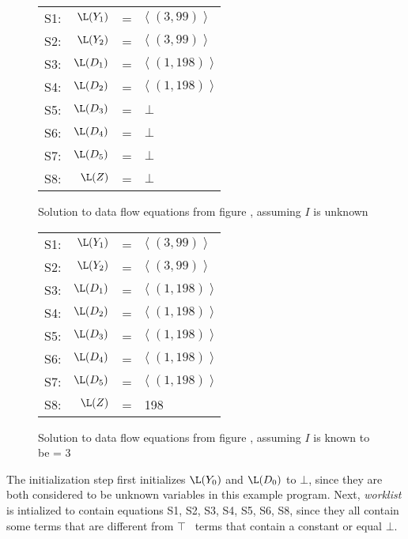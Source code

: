 \begin{figure}
\begin{center}
\begin{tabular}{r r c l}
\mbox{S1:} & $\L(Y_1)$ & = & $\langle \; (3,99)\; \rangle$ \\
\mbox{S2:} & $\L(Y_2)$ & = & $\langle \; (3,99)\; \rangle$ \\
\mbox{S3:} & $\L(D_1)$ & = & $\langle \; (1,198)\; \rangle$ \\
\mbox{S4:} & $\L(D_2)$ & = & $\langle \; (1,198)\; \rangle$ \\
\mbox{S5:} & $\L(D_3)$ & = & $\bot$\\
\mbox{S6:} & $\L(D_4)$ & = & $\bot$\\
\mbox{S7:} & $\L(D_5)$ & = & $\bot$\\
\mbox{S8:} & $\L(Z)$ & =  & $\bot$
\end{tabular}
\end{center}
\caption{Solution to data flow equations from figure \protect{\ref{fig:sc-ex-df}}, assuming $I$ is unknown}
\label{fig:sc-ex-sol1}
\end{figure}

\begin{figure}
\begin{center}
\begin{tabular}{r r c l}
\mbox{S1:} & $\L(Y_1)$ & = & $\langle \; (3,99)\; \rangle$ \\
\mbox{S2:} & $\L(Y_2)$ & = & $\langle \; (3,99)\; \rangle$ \\
\mbox{S3:} & $\L(D_1)$ & = & $\langle \; (1,198)\; \rangle$ \\
\mbox{S4:} & $\L(D_2)$ & = & $\langle \; (1,198)\; \rangle$ \\
\mbox{S5:} & $\L(D_3)$ & = & $\langle \; (1,198)\; \rangle$ \\
\mbox{S6:} & $\L(D_4)$ & = & $\langle \; (1,198)\; \rangle$ \\
\mbox{S7:} & $\L(D_5)$ & = & $\langle \; (1,198)\; \rangle$ \\
\mbox{S8:} & $\L(Z)$ & =  & 198
\end{tabular}
\end{center}
\caption{Solution to data flow equations from figure \protect{\ref{fig:sc-ex-df}}, assuming $I$ is known to be = 3}
\label{fig:sc-ex-sol2}
\end{figure}

The initialization step first initializes $\L(Y_0)$
and $\L(D_0)$ to $\bot$, since they are both considered to be unknown
variables in this example program.  Next, {\it worklist} is intialized
to contain equations S1, S2, S3, S4, S5, S6, S8, since they all
contain some terms that are different from $\top$ \ie\ terms that
contain a constant or equal $\bot$.

